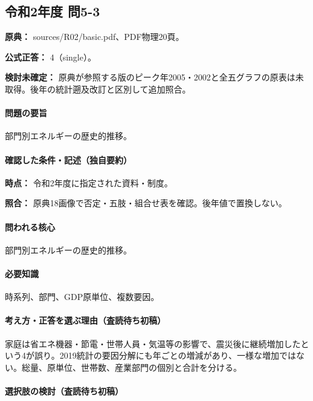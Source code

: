 \subsection{令和2年度 問5-3}
\label{q:r02-reg-basic-5-3}

\noindent\textbf{原典：} sources/R02/basic.pdf、PDF物理20頁。

\textbf{公式正答：} 4（single）。

\par\textbf{検討未確定：} 原典が参照する版のピーク年2005・2002と全五グラフの原表は未取得。後年の統計遡及改訂と区別して追加照合。

\paragraph{問題の要旨} 部門別エネルギーの歴史的推移。

\paragraph{確認した条件・記述（独自要約）}\mbox{}\par

\noindent\textbf{時点：} 令和2年度に指定された資料・制度。\par

\noindent\textbf{照合：} 原典18画像で否定・五肢・組合せ表を確認。後年値で置換しない。\par

\paragraph{問われる核心} 部門別エネルギーの歴史的推移。

\paragraph{必要知識} 時系列、部門、GDP原単位、複数要因。

\paragraph{考え方・正答を選ぶ理由（査読待ち初稿）} 家庭は省エネ機器・節電・世帯人員・気温等の影響で、震災後に継続増加したという4が誤り。2019統計の要因分解にも年ごとの増減があり、一様な増加ではない。総量、原単位、世帯数、産業部門の個別と合計を分ける。

\paragraph{選択肢の検討（査読待ち初稿）}\mbox{}\par

